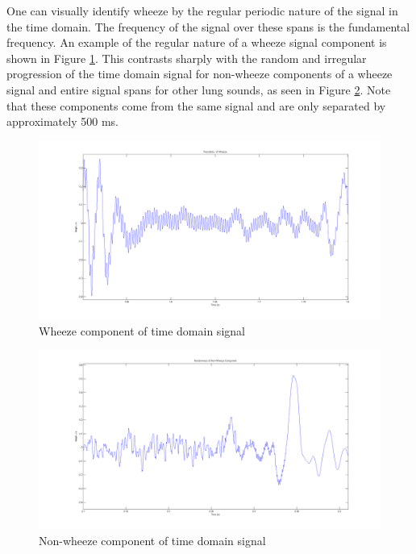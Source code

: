 \documentclass{article}
\begin{document}
One can visually identify wheeze by the regular periodic nature of the signal in the time domain. The frequency of the signal over these spans is the fundamental frequency. An example of the regular nature of a wheeze signal component is shown in Figure \ref{fig:WheezePeriodicity}. This contrasts sharply with the random and irregular progression of the time domain signal for non-wheeze components of a wheeze signal and entire signal spans for other lung sounds, as seen in Figure \ref{fig:WheezeRandomness}. Note that these components come from the same signal and are only separated by approximately 500 ms. \\

\begin{figure}[H]
	\includegraphics[width=\linewidth]{images/WheezePeriodicity.png}
	\caption{Wheeze component of time domain signal}
 	\label{fig:WheezePeriodicity}
\end{figure}
\begin{figure}[H]
	\includegraphics[width=\linewidth]{images/WheezeRandomness.png}
	\caption{Non-wheeze component of time domain signal}
 	\label{fig:WheezeRandomness}
\end{figure}
\end{document}
